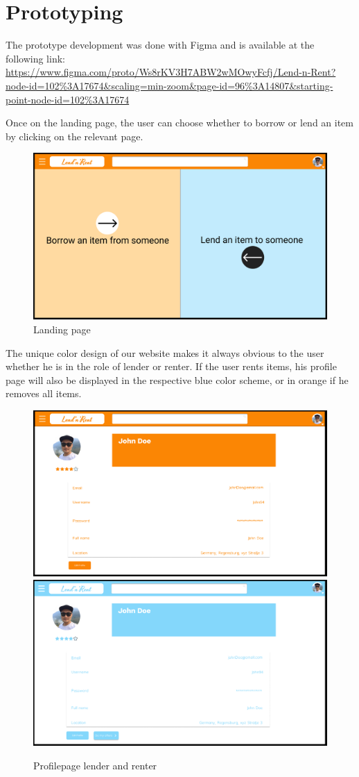\section{Prototyping}

The prototype development was done with Figma and is available at the following link: \\ \url{https://www.figma.com/proto/Ws8rKV3H7ABW2wMOwyFcfj/Lend-n-Rent?node-id=102%3A17674&scaling=min-zoom&page-id=96%3A14807&starting-point-node-id=102%3A17674}

\noindent
Once on the landing page, the user can choose whether to borrow or lend an item by clicking on the relevant page.

\begin{figure}[H]
	\centering
	\includegraphics[width=0.5\linewidth]{abb/1landing}
	\caption{Landing page}
	\label{fig:1landing}
\end{figure} 

\noindent
The unique color design of our website makes it always obvious to the user whether he is in the role of lender or renter. If the user rents items, his profile page will also be displayed in the respective blue color scheme, or in orange if he removes all items.

\begin{figure}[H]
	\centering
	\includegraphics[width=0.49\linewidth]{abb/11profilerent}
	\includegraphics[width=0.49\linewidth]{abb/6profilelend}
	\caption{Profilepage lender and renter}
	\label{fig:profile}
	\centering
\end{figure}


